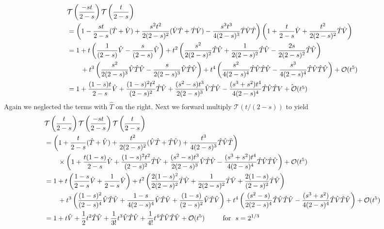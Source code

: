 \documentclass[11pt]{article}
\numberwithin{equation}{section}
\begin{document}
\begin{align*}
&\mathcal{T}\left(\frac{-st}{2-s}\right)\mathcal{T}\left(\frac{t}{2-s}\right)\\
&= \left( 1 - \frac{st}{2-s}(\hat{T}+\hat{V}) + \frac{s^2t^2}{2(2-s)^2}(\hat{V}\hat{T}+\hat{T}\hat{V}) - \frac{s^3t^3}{4(2-s)^3}\hat{T}\hat{V}\hat{T}\right)\left(1 + \frac{t}{2-s}\hat{V} + \frac{t^2}{2(2-s)^2}\hat{T}\hat{V}\right)\\
&= 1 + t\left(\frac{1}{(2-s)}\hat{V}-\frac{s}{(2-s)}\hat{V}\right) + t^2\left(\frac{s^2}{2(2-s)^2}\hat{T}\hat{V} + \frac{1}{2(2-s)^2}\hat{T}\hat{V} - \frac{2s}{2(2-s)^2}\hat{T}\hat{V}\right)\\
&\qquad + t^3\left(\frac{s^2}{2(2-s)^3}\hat{V}\hat{T}\hat{V} - \frac{s}{2(2-s)^3}\hat{V}\hat{T}\hat{V}\right)
+ t^4\left(\frac{s^2}{4(2-s)^4}\hat{T}\hat{V}\hat{T}\hat{V} - \frac{s^3}{4(2-s)^4}\hat{T}\hat{V}\hat{T}\hat{V}\right) + \mathcal{O}(t^5)\\
&= 1 + \frac{(1-s)t}{2-s}\hat{V} + \frac{(1-s)^2t^2}{(2-s)^2}\hat{T}\hat{V} + \frac{(s^2-s)t^3}{2(2-s)^3}\hat{V}\hat{T}\hat{V} - \frac{(s^3+s^2)t^4}{4(2-s)^4}\hat{T}\hat{V}\hat{T}\hat{V + \mathcal{O}(t^5)}
\end{align*}
Again we neglected the terms with $\hat{T}$ on the right.  Next we forward multiply 
$\mathcal{T}(t/(2-s))$ to yield
\begin{align*}
&\mathcal{T}\left(\frac{t}{2-s}\right)\mathcal{T}\left(\frac{-st}{2-s}\right)\mathcal{T}\left(\frac{t}{2-s}\right)\\
&=  \left(1 + \frac{t}{2-s}(\hat{T}+\hat{V}) + \frac{t^2}{2(2-s)^2}(\hat{V}\hat{T}+\hat{T}\hat{V}) + \frac{t^3}{4(2-s)^3}\hat{T}\hat{V}\hat{T}\right)\\
&\qquad\times \left(1 + \frac{t(1-s)}{2-s}\hat{V} + \frac{(1-s)^2t^2}{(2-s)^2}\hat{T}\hat{V}+ \frac{(s^2-s)t^3}{2(2-s)^3}\hat{V}\hat{T}\hat{V} - \frac{(s^3+s^2)t^4}{4(2-s)^4}\hat{T}\hat{V}\hat{T}\hat{V}\right)+\mathcal{O}(t^5)\\
&= 1 + t\left(\frac{1-s}{2-s}\hat{V}+\frac{1}{2-s}\hat{V}\right) + t^2\left(\frac{2(1-s)^2}{2(2-s)^2}\hat{T}\hat{V} + \frac{1}{2(2-s)^2}\hat{T}\hat{V} + \frac{2(1-s)}{(2-s)^2}\hat{T}\hat{V}\right)\\
&\qquad + t^3\left(\frac{(1-s)^2}{(2-s)^4}\hat{V}\hat{T}\hat{V} + \frac{1-s}{4(2-s)^4}\hat{V}\hat{T}\hat{V} + \frac{(1-s)}{(2-s)^2}\hat{V}\hat{T}\hat{V}\right) + t^4\left(\frac{(s^2-s)}{2(2-s)^4}\hat{T}\hat{V}\hat{T}\hat{V}-\frac{(s^3+s^2)}{4(2-s)^4}\hat{T}\hat{V}\hat{T}\hat{V}\right)+\mathcal{O}(t^5)\\
&= 1 + t\hat{V} + \frac{1}{2}t^2\hat{T}\hat{V} + \frac{1}{3!}t^3\hat{V}\hat{T}\hat{V} +  \frac{1}{4!}t^4\hat{T}\hat{V}\hat{T}\hat{V} + \mathcal{O}(t^5) \qquad\textnormal{ \ for \ } s=2^{1/3}
\end{align*}
\end{document}
